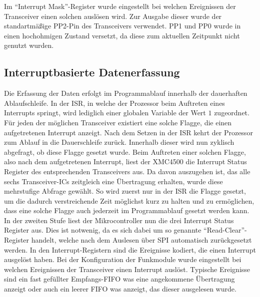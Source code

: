 Im \enquote{Interrupt Mask}-Register wurde eingestellt bei welchen Ereignissen der Transceiver einen solchen auslösen wird. Zur Ausgabe dieser wurde der standartmäßige PP2-Pin des Transceivers verwendet. PP1 und PP0 wurde in einen hochohmigen Zustand versetzt, da diese zum aktuellen Zeitpunkt nicht genutzt wurden.
 
 
 
 




\subsection{Interruptbasierte Datenerfassung}


Die Erfassung der Daten erfolgt im Programmablauf innerhalb der dauerhaften Ablaufschleife.
In der \acf{ISR}, in welche der Prozessor beim Auftreten eines Interrupts springt, wird lediglich einer globalen Variable der Wert $1$ zugeordnet. Für jeden der möglichen Transceiver existiert eine solche Flagge, die einen aufgetretenen Interrupt anzeigt. Nach dem Setzen in der \ac{ISR} kehrt der Prozessor zum Ablauf in die Dauerschleife zurück. Innerhalb dieser wird nun zyklisch abgefragt, ob diese Flagge gesetzt wurde. Beim Auftreten einer solchen Flagge, also nach dem aufgetretenen Interrupt, liest der XMC4500 die  Interrupt Status Register des entsprechenden Transceivers aus. 
Da davon auszugehen ist, das alle sechs Transceiver-\acp{IC} zeitgleich eine Übertragung erhalten, wurde diese mehrstufige Abfrage gewählt. So wird zuerst nur in der \ac{ISR} die Flagge gesetzt, um die dadurch verstreichende Zeit möglichst kurz zu halten und zu ermöglichen, dass eine solche Flagge auch jederzeit im Programmablauf gesetzt werden kann. In der zweiten Stufe liest der Mikrocontroller nun die drei Interrupt Status Register aus. Dies ist notwenig, da es sich dabei um so genannte \enquote{Read-Clear}-Register handelt, welche  nach dem Auslesen über SPI automatisch zurückgesetzt werden.
In den Interrupt-Registern sind die Ereignisse kodiert, die einen Interrupt ausgelöst haben. Bei der Konfiguration der Funkmodule wurde eingestellt bei welchen Ereignissen der Transceiver einen Interrupt auslöst. Typische Ereignisse sind ein fast gefüllter Empfangs-\ac{FIFO} was eine angekommene Übertragung anzeigt oder auch ein leerer \ac{FIFO} was anzeigt, das dieser ausgelesen wurde. 
